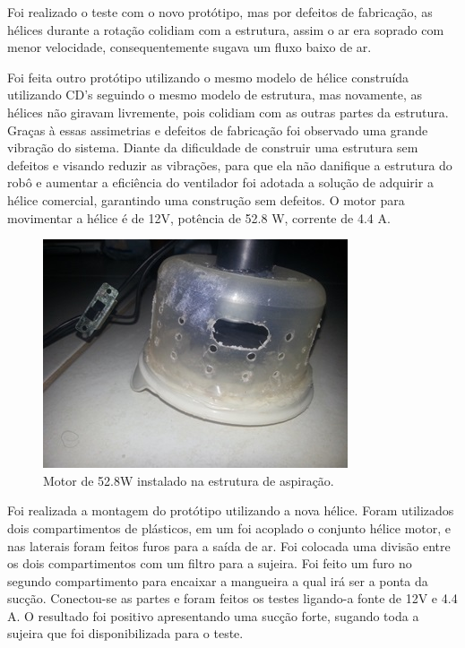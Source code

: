 		Foi realizado o teste com o novo protótipo, mas por defeitos de fabricação, as hélices durante a rotação colidiam com a estrutura, assim o ar era soprado com menor velocidade, consequentemente sugava um fluxo baixo de ar. 

		Foi feita outro protótipo utilizando o mesmo modelo de hélice construída utilizando CD’s seguindo o mesmo modelo de estrutura, mas novamente, as hélices não giravam livremente, pois colidiam com as outras partes da estrutura. Graças à essas assimetrias e defeitos de fabricação foi observado uma grande vibração do sistema. Diante da dificuldade de construir uma estrutura sem defeitos e visando reduzir as vibrações, para que ela não danifique a estrutura do robô e aumentar a eficiência do ventilador foi adotada a solução de adquirir a hélice comercial, garantindo uma construção sem defeitos. O motor para movimentar a hélice é de 12V, potência de 52.8 W, corrente de 4.4 A.

		\begin{figure}[H]
			\centering
			\includegraphics[scale=1]{figuras/asppc2_9.jpg}
			\caption{Motor de 52.8W instalado na estrutura de aspiração.}
			\label{img:estrutura_motor_52.8W}
		\end{figure}

		Foi realizada a montagem do protótipo utilizando a nova hélice. Foram utilizados dois compartimentos de plásticos, em um foi acoplado o conjunto hélice motor, e nas laterais foram feitos furos para a saída de ar. Foi colocada uma divisão entre os dois compartimentos com um filtro para a sujeira. Foi feito um furo no segundo compartimento para encaixar a mangueira a qual irá ser a ponta da sucção. Conectou-se as partes e foram feitos os testes ligando-a fonte de 12V e 4.4 A. O resultado foi positivo apresentando uma sucção forte, sugando toda a sujeira que foi disponibilizada para o teste.

